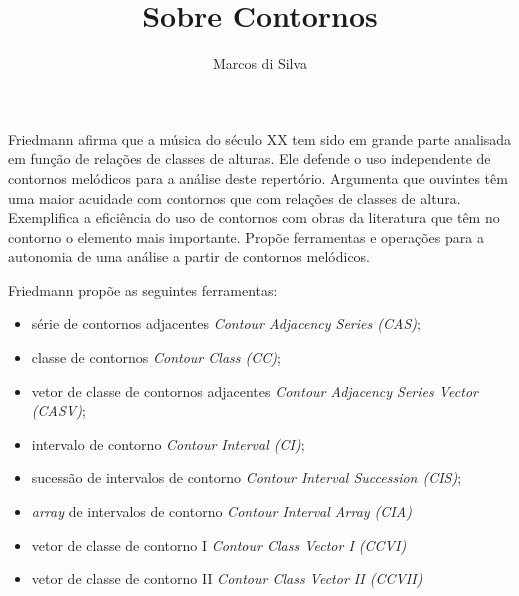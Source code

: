\documentclass{article}
\title{Sobre Contornos}
\author{Marcos di Silva}
\newcommand{\eng}[1]{\textit{#1}}
\begin{document}
\setlength{\parindent}{0cm}
\maketitle

Friedmann \cite{friedmann85:_method_discus_contour} afirma que a
música do século XX tem sido em grande parte analisada em função de
relações de classes de alturas. Ele defende o uso independente de
contornos melódicos para a análise deste repertório. Argumenta que
ouvintes têm uma maior acuidade com contornos que com relações de
classes de altura. Exemplifica a eficiência do uso de contornos com
obras da literatura que têm no contorno o elemento mais
importante. Propõe ferramentas e operações para a autonomia de uma
análise a partir de contornos melódicos.

Friedmann \cite{friedmann85:_method_discus_contour} propõe as seguintes
ferramentas:

\begin{itemize}
\item série de contornos adjacentes \eng{Contour Adjacency Series
    (CAS)};
\item classe de contornos \eng{Contour Class (CC)};
\item vetor de classe de contornos adjacentes \eng{Contour Adjacency
    Series Vector (CASV)};
\item intervalo de contorno \eng{Contour Interval (CI)};
\item sucessão de intervalos de contorno \eng{Contour Interval
    Succession (CIS)};
\item \eng{array} de intervalos de contorno \eng{Contour Interval
    Array (CIA)}
\item vetor de classe de contorno I \eng{Contour Class Vector I
    (CCVI)}
\item vetor de classe de contorno II \eng{Contour Class Vector II
    (CCVII)}
\end{itemize}



\end{document}
